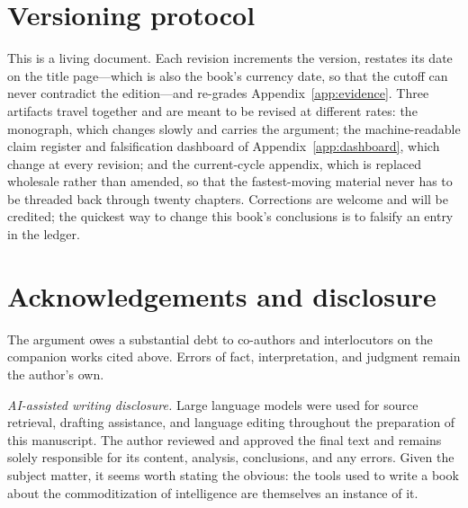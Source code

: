 \section*{Versioning protocol}

This is a living document. Each revision increments the version, restates its date on the title page---which is also the book's currency date, so that the cutoff can never contradict the edition---and re-grades Appendix~\ref{app:evidence}. Three artifacts travel together and are meant to be revised at different rates: the monograph, which changes slowly and carries the argument; the machine-readable claim register and falsification dashboard of Appendix~\ref{app:dashboard}, which change at every revision; and the current-cycle appendix, which is replaced wholesale rather than amended, so that the fastest-moving material never has to be threaded back through twenty chapters. Corrections are welcome and will be credited; the quickest way to change this book's conclusions is to falsify an entry in the ledger.

\section*{Acknowledgements and disclosure}

The argument owes a substantial debt to co-authors and interlocutors on the companion works cited above. Errors of fact, interpretation, and judgment remain the author's own.

\emph{AI-assisted writing disclosure.} Large language models were used for source retrieval, drafting assistance, and language editing throughout the preparation of this manuscript. The author reviewed and approved the final text and remains solely responsible for its content, analysis, conclusions, and any errors. Given the subject matter, it seems worth stating the obvious: the tools used to write a book about the commoditization of intelligence are themselves an instance of it.
